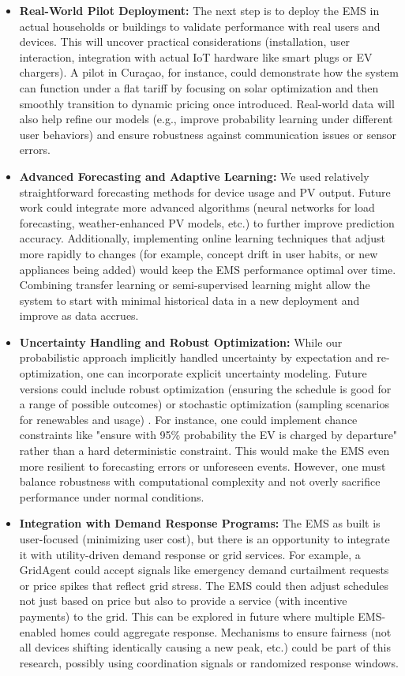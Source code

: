 \documentclass[12pt,a4paper]{article}
\begin{document}
\begin{itemize}
    \item \textbf{Real-World Pilot Deployment:} The next step is to deploy the EMS in actual households or buildings to validate performance with real users and devices. This will uncover practical considerations (installation, user interaction, integration with actual IoT hardware like smart plugs or EV chargers). A pilot in Curaçao, for instance, could demonstrate how the system can function under a flat tariff by focusing on solar optimization and then smoothly transition to dynamic pricing once introduced. Real-world data will also help refine our models (e.g., improve probability learning under different user behaviors) and ensure robustness against communication issues or sensor errors.
    \item \textbf{Advanced Forecasting and Adaptive Learning:} We used relatively straightforward forecasting methods for device usage and PV output. Future work could integrate more advanced algorithms (neural networks for load forecasting, weather-enhanced PV models, etc.) to further improve prediction accuracy. Additionally, implementing online learning techniques that adjust more rapidly to changes (for example, concept drift in user habits, or new appliances being added) would keep the EMS performance optimal over time. Combining transfer learning or semi-supervised learning might allow the system to start with minimal historical data in a new deployment and improve as data accrues.
    \item \textbf{Uncertainty Handling and Robust Optimization:} While our probabilistic approach implicitly handled uncertainty by expectation and re-optimization, one can incorporate explicit uncertainty modeling. Future versions could include robust optimization (ensuring the schedule is good for a range of possible outcomes) or stochastic optimization (sampling scenarios for renewables and usage) \cite{Chen2024, Koltsaklis2019}. For instance, one could implement chance constraints like "ensure with 95\% probability the EV is charged by departure" rather than a hard deterministic constraint. This would make the EMS even more resilient to forecasting errors or unforeseen events. However, one must balance robustness with computational complexity and not overly sacrifice performance under normal conditions.
    \item \textbf{Integration with Demand Response Programs:} The EMS as built is user-focused (minimizing user cost), but there is an opportunity to integrate it with utility-driven demand response or grid services. For example, a GridAgent could accept signals like emergency demand curtailment requests or price spikes that reflect grid stress. The EMS could then adjust schedules not just based on price but also to provide a service (with incentive payments) to the grid. This can be explored in future where multiple EMS-enabled homes could aggregate response. Mechanisms to ensure fairness (not all devices shifting identically causing a new peak, etc.) could be part of this research, possibly using coordination signals or randomized response windows.

\end{itemize}
\end{document}
